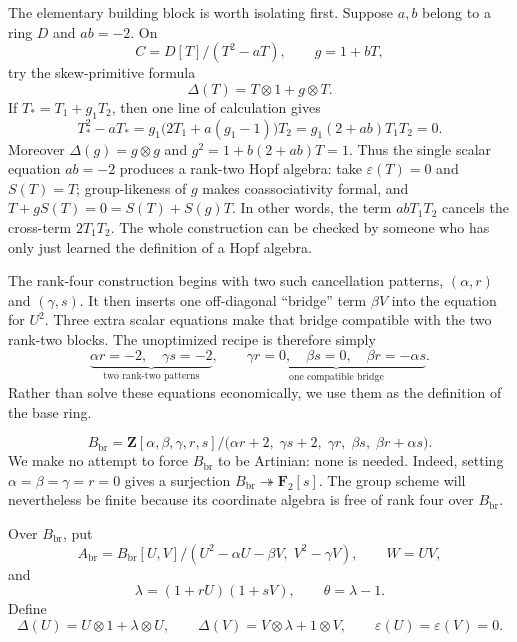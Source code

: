 \documentclass[11pt]{article}
\theoremstyle{remark}
\newcommand{\Z}{\mathbf Z}
\newcommand{\F}{\mathbf F}
\newcommand{\eps}{\varepsilon}
\newcommand{\ot}{\otimes}
\begin{document}
The elementary building block is worth isolating first.  Suppose
$a,b$ belong to a ring $D$ and $ab=-2$.  On
\[
 C=D[T]/(T^2-aT),
 \qquad g=1+bT,
\]
try the skew-primitive formula
\[
 \Delta(T)=T\ot1+g\ot T.
\]
If $T_*=T_1+g_1T_2$, then one line of calculation gives
\begin{equation}\label{eq:rank-two-block}
 T_*^2-aT_*
 =g_1\bigl(2T_1+a(g_1-1)\bigr)T_2
 =g_1(2+ab)T_1T_2=0.
\end{equation}
Moreover $\Delta(g)=g\ot g$ and
$g^2=1+b(2+ab)T=1$.  Thus the single scalar equation $ab=-2$
produces a rank-two Hopf algebra: take $\eps(T)=0$ and $S(T)=T$;
group-likeness of $g$ makes coassociativity formal, and
$T+gS(T)=0=S(T)+S(g)T$.  In other words, the term $abT_1T_2$
cancels the cross-term $2T_1T_2$.  The whole construction can be checked by
someone who has only just learned the definition of a Hopf algebra.

The rank-four construction begins with two such cancellation patterns,
$(\alpha,r)$ and $(\gamma,s)$.  It then inserts one off-diagonal
``bridge'' term $\beta V$ into the equation for $U^2$.  Three extra scalar
equations make that bridge compatible with the two rank-two blocks.  The
unoptimized recipe is therefore simply
\begin{equation}\label{eq:large-five-relations}
 \underbrace{\alpha r=-2,\quad \gamma s=-2}_{
   \text{two rank-two patterns}},
 \qquad
 \underbrace{\gamma r=0,\quad\beta s=0,\quad
   \beta r=-\alpha s}_{\text{one compatible bridge}}.
\end{equation}
Rather than solve these equations economically, we use them as the
definition of the base ring.

\begin{equation}\label{eq:large-base}
 B_{\mathrm{br}}=\Z[\alpha,\beta,\gamma,r,s]
   /\bigl(\alpha r+2,\;\gamma s+2,\;
           \gamma r,\;\beta s,\;\beta r+\alpha s\bigr).
\end{equation}
We make no attempt to force $B_{\mathrm{br}}$ to be Artinian: none is
needed.  Indeed, setting $\alpha=\beta=\gamma=r=0$ gives a surjection
$B_{\mathrm{br}}\twoheadrightarrow\F_2[s]$.  The group scheme will nevertheless be
finite because its coordinate algebra is free of rank four over
$B_{\mathrm{br}}$.

Over $B_{\mathrm{br}}$, put
\begin{equation}\label{eq:large-A}
 A_{\mathrm{br}}=B_{\mathrm{br}}[U,V]
 /(U^2-\alpha U-\beta V,\;V^2-\gamma V),
 \qquad W=UV,
\end{equation}
and
\begin{equation}\label{eq:large-lambda}
 \lambda=(1+rU)(1+sV),
 \qquad
 \theta=\lambda-1.
\end{equation}
Define
\begin{equation}\label{eq:large-Delta}
 \Delta(U)=U\ot1+\lambda\ot U,
 \qquad
 \Delta(V)=V\ot\lambda+1\ot V,
 \qquad
 \eps(U)=\eps(V)=0.
\end{equation}
\end{document}
